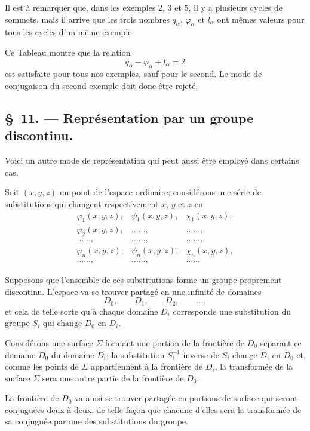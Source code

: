 \documentclass{article}
\begin{document}
Il est à remarquer que, dans les exemples 2, 3 et 5, il y a plusieurs cycles de sommets, mais il arrive que les trois nombres $q_{\alpha}$, $\varphi_{\alpha}$ et $l_{\alpha}$ ont mêmes valeurs pour tous les cycles d'un même exemple.

Ce Tableau montre que la relation
\[ q_{\alpha} - \varphi_{\alpha} + l_{\alpha} = 2 \]
est satisfaite pour tous nos exemples, sauf pour le second. Le mode de conjugaison du second exemple doit donc être rejeté.

\subsection*{\S~11. --- Représentation par un groupe discontinu.}

Voici un autre mode de représentation qui peut aussi être employé dans certains cas.

Soit $(x, y, z)$ un point de l'espace ordinaire; considérons une série de substitutions qui changent respectivement $x$, $y$ et $z$ en
\[ \begin{matrix} \varphi_{1}(x, y, z), & \psi_{1}(x, y, z), & \chi_{1}(x, y, z), \\[1ex] \varphi_{2}(x, y, z), & \ldots\ldots, & \ldots\ldots, \\[1ex] \ldots\ldots, & \ldots\ldots, & \ldots\ldots, \\[1ex] \varphi_{n}(x, y, z), & \psi_{n}(x, y, z), & \chi_{n}(x, y, z), \\[1ex] \ldots\ldots, & \ldots\ldots, & \ldots\ldots \end{matrix} \]

Supposons que l'ensemble de ces substitutions forme un groupe proprement discontinu. L'espace va se trouver partagé en une infinité de domaines
\[ D_{0}, \qquad D_{1}, \qquad D_{2}, \qquad \ldots, \]
et cela de telle sorte qu'à chaque domaine $D_{i}$ corresponde une substitution du groupe $S_{i}$ qui change $D_{0}$ en $D_{i}$.

Considérons une surface $\Sigma$ formant une portion de la frontière de $D_{0}$ séparant ce domaine $D_{0}$ du domaine $D_{i}$; la substitution $S^{-1}_{i}$ inverse de $S_{i}$ change $D_{i}$ en $D_{0}$ et, comme les points de $\Sigma$ appartiennent à la frontière de $D_{i}$, la transformée de la surface $\Sigma$ sera une autre partie de la frontière de $D_{0}$.

La frontière de $D_{0}$ va ainsi se trouver partagée en portions de surface qui seront conjuguées deux à deux, de telle façon que chacune d'elles sera la transformée de sa conjuguée par une des substitutions du groupe.
\end{document}
